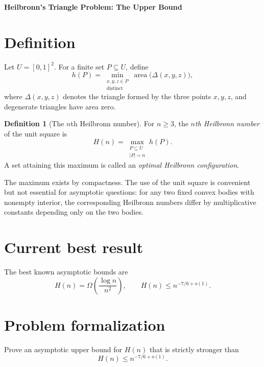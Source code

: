 \documentclass[11pt,a4paper]{article}
\newcommand{\Area}{\operatorname{area}}
\theoremstyle{definition}
\newtheorem{definition}{Definition}
\begin{document}
\begin{center}
  {\Large\bfseries Heilbronn's Triangle Problem: The Upper Bound}
\end{center}
\section{Definition}
Let $U=[0,1]^2$. For a finite set $P\subseteq U$, define
\begin{equation}\label{eq:delta}
 h(P)
 =\min_{\substack{x,y,z\in P\\\text{distinct}}}
   \Area\bigl(\Delta(x,y,z)\bigr),
\end{equation}
where $\Delta(x,y,z)$ denotes the triangle formed by the three points $x,y,z$,
and degenerate triangles have area zero.

\begin{definition}[The $n$th Heilbronn number]
For $n\geq 3$, the \emph{$n$th Heilbronn number} of the unit square is
\begin{equation}\label{eq:H}
 H(n)=\max_{\substack{P\subseteq U\\|P|=n}} h(P).
\end{equation}
A set attaining this maximum is called an \emph{optimal Heilbronn
configuration}.
\end{definition}

The maximum exists by compactness. The use of the unit square is convenient but
not essential for asymptotic questions: for any two fixed convex bodies with
nonempty interior, the corresponding Heilbronn numbers differ by multiplicative
constants depending only on the two bodies.


\section{Current best result}
The best known asymptotic bounds are
\begin{equation}
  H(n)=\Omega\!\left(\frac{\log n}{n^2}\right),
  \qquad
  H(n)\leq n^{-7/6+o(1)}.
\end{equation}


\section{Problem formalization}

Prove an asymptotic upper bound for $H(n)$ that is strictly stronger than
\begin{equation}
  H(n)\leq n^{-7/6+o(1)}.
\end{equation}
\end{document}
